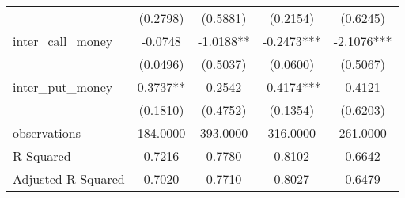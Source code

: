 \begin{tabular}{lcccc}
                   & (0.2798)  & (0.5881)   & (0.2154)   & (0.6245)    \\
inter\_call\_money & -0.0748   & -1.0188**  & -0.2473*** & -2.1076***  \\
                   & (0.0496)  & (0.5037)   & (0.0600)   & (0.5067)    \\
inter\_put\_money  & 0.3737**  & 0.2542     & -0.4174*** & 0.4121      \\
                   & (0.1810)  & (0.4752)   & (0.1354)   & (0.6203)    \\
observations       & 184.0000  & 393.0000   & 316.0000   & 261.0000    \\
R-Squared          & 0.7216    & 0.7780     & 0.8102     & 0.6642      \\
Adjusted R-Squared & 0.7020    & 0.7710     & 0.8027     & 0.6479      \\
\hline
\end{tabular}